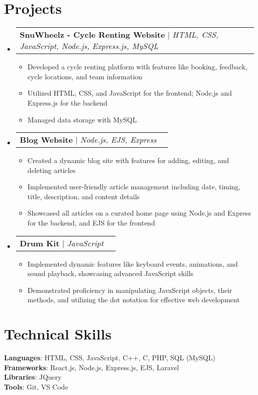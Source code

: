 \documentclass[letterpaper,11pt]{article}
\makeatletter
\newcommand{\resumeItem}[1]{
  \item\small{
    {#1 \vspace{-2pt}}
  }
}
\newcommand{\resumeProjectHeading}[2]{
    \item
    \begin{tabular*}{0.97\textwidth}{l@{\extracolsep{\fill}}r}
      \small#1 & #2 \\
    \end{tabular*}\vspace{-7pt}
}
\newcommand{\resumeSubHeadingListStart}{\begin{itemize}[leftmargin=0.15in, label={}]}
\newcommand{\resumeSubHeadingListEnd}{\end{itemize}}
\newcommand{\resumeItemListStart}{\begin{itemize}}
\newcommand{\resumeItemListEnd}{\end{itemize}\vspace{-5pt}}
\makeatother
\begin{document}
\section{Projects}
    \resumeSubHeadingListStart
      \resumeProjectHeading
          {\textbf{SnuWheelz - Cycle Renting Website} $|$ \emph{HTML, CSS, JavaScript, Node.js, Express.js, MySQL}}{}
          \resumeItemListStart
            \resumeItem{Developed a cycle renting platform with features like booking, feedback, cycle locations, and team information}
            \resumeItem{Utilized HTML, CSS, and JavaScript for the frontend; Node.js and Express.js for the backend}
            \resumeItem{Managed data storage with MySQL}
          \resumeItemListEnd
      \resumeProjectHeading
          {\textbf{Blog Website} $|$ \emph{Node.js, EJS, Express}}{}
          \resumeItemListStart
            \resumeItem{Created a dynamic blog site with features for adding, editing, and deleting articles}
            \resumeItem{Implemented user-friendly article management including date, timing, title, description, and content details}
            \resumeItem{Showcased all articles on a curated home page using Node.js and Express for the backend, and EJS for the frontend}
          \resumeItemListEnd
      \resumeProjectHeading
          {\textbf{Drum Kit} $|$ \emph{JavaScript}}{}
          \resumeItemListStart
            \resumeItem{Implemented dynamic features like keyboard events, animations, and sound playback, showcasing advanced JavaScript skills}
            \resumeItem{Demonstrated proficiency in manipulating JavaScript objects, their methods, and utilizing the dot notation for effective web development}
          \resumeItemListEnd
    \resumeSubHeadingListEnd


\section{Technical Skills}
\begin{itemize}[leftmargin=0.15in, label={}]
    \small{\item{
     \textbf{Languages}{: HTML, CSS, JavaScript, C++, C, PHP, SQL (MySQL)} \\
     \textbf{Frameworks}{: React.js, Node.js, Express.js, EJS, Laravel} \\
     \textbf{Libraries}{: JQuery} \\
     \textbf{Tools}{: Git, VS Code}
    }}
 \end{itemize}
\end{document}
